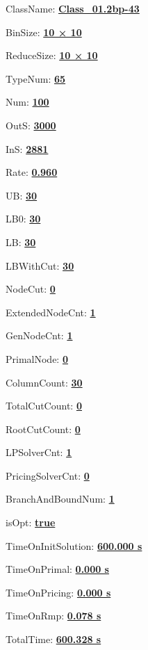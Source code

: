 \documentclass[11pt]{article}
\begin{document}
\pagestyle{empty}


ClassName: \underline{\textbf{Class_01.2bp-43}}
\par
BinSize: \underline{\textbf{10 × 10}}
\par
ReduceSize: \underline{\textbf{10 × 10}}
\par
TypeNum: \underline{\textbf{65}}
\par
Num: \underline{\textbf{100}}
\par
OutS: \underline{\textbf{3000}}
\par
InS: \underline{\textbf{2881}}
\par
Rate: \underline{\textbf{0.960}}
\par
UB: \underline{\textbf{30}}
\par
LB0: \underline{\textbf{30}}
\par
LB: \underline{\textbf{30}}
\par
LBWithCut: \underline{\textbf{30}}
\par
NodeCut: \underline{\textbf{0}}
\par
ExtendedNodeCnt: \underline{\textbf{1}}
\par
GenNodeCnt: \underline{\textbf{1}}
\par
PrimalNode: \underline{\textbf{0}}
\par
ColumnCount: \underline{\textbf{30}}
\par
TotalCutCount: \underline{\textbf{0}}
\par
RootCutCount: \underline{\textbf{0}}
\par
LPSolverCnt: \underline{\textbf{1}}
\par
PricingSolverCnt: \underline{\textbf{0}}
\par
BranchAndBoundNum: \underline{\textbf{1}}
\par
isOpt: \underline{\textbf{true}}
\par
TimeOnInitSolution: \underline{\textbf{600.000 s}}
\par
TimeOnPrimal: \underline{\textbf{0.000 s}}
\par
TimeOnPricing: \underline{\textbf{0.000 s}}
\par
TimeOnRmp: \underline{\textbf{0.078 s}}
\par
TotalTime: \underline{\textbf{600.328 s}}
\par
\newpage


\end{document}
